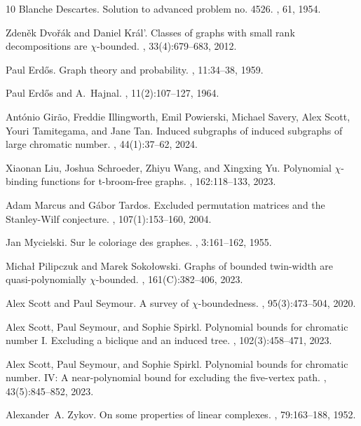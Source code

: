 \begin{thebibliography}{10}
Blanche Descartes.
\newblock Solution to advanced problem no. 4526.
, 61, 1954.

Zdeněk Dvořák and Daniel Král’.
\newblock Classes of graphs with small rank decompositions are $\chi$-bounded.
, 33(4):679--683, 2012.

Paul Erd\H{o}s.
\newblock Graph theory and probability.
, 11:34--38, 1959.

Paul Erdős and A.~Hajnal.
, 11(2):107--127, 1964.

Ant{\'{o}}nio Gir{\~{a}}o, Freddie Illingworth, Emil Powierski, Michael Savery,
  Alex Scott, Youri Tamitegama, and Jane Tan.
\newblock Induced subgraphs of induced subgraphs of large chromatic number.
, 44(1):37--62, 2024.

Xiaonan Liu, Joshua Schroeder, Zhiyu Wang, and Xingxing Yu.
\newblock Polynomial $\chi$-binding functions for t-broom-free graphs.
, 162:118--133, 2023.

Adam Marcus and G{\'a}bor Tardos.
\newblock Excluded permutation matrices and the {S}tanley-{W}ilf conjecture.
, 107(1):153--160,
  2004.

Jan Mycielski.
\newblock Sur le coloriage des graphes.
, 3:161--162, 1955.

Micha\l{} Pilipczuk and Marek Soko\l{}owski.
\newblock Graphs of bounded twin-width are quasi-polynomially $\chi$-bounded.
, 161(C):382--406, 2023.

Alex Scott and Paul Seymour.
\newblock A survey of $\chi$-boundedness.
, 95(3):473--504, 2020.

Alex Scott, Paul Seymour, and Sophie Spirkl.
\newblock Polynomial bounds for chromatic number {I}. {E}xcluding a biclique
  and an induced tree.
, 102(3):458--471, 2023.

Alex Scott, Paul Seymour, and Sophie Spirkl.
\newblock Polynomial bounds for chromatic number. {IV}: A near-polynomial bound
  for excluding the five-vertex path.
, 43(5):845--852, 2023.

Alexander~A. Zykov.
\newblock On some properties of linear complexes.
, 79:163--188, 1952.

\end{thebibliography}
